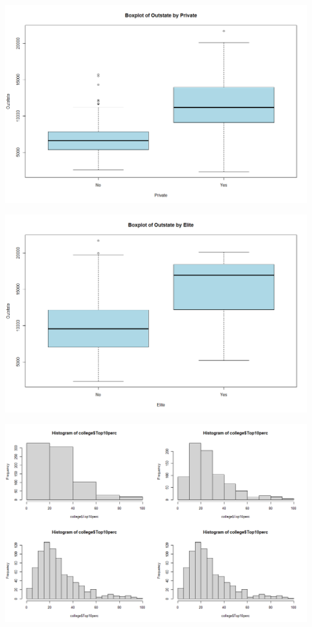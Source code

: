 \documentclass{article}
\begin{document}
\includegraphics[scale=0.5]{ciii.png}

\includegraphics[scale=0.5]{civ.png}

\includegraphics[scale=0.5]{cv.png}
\end{document}
